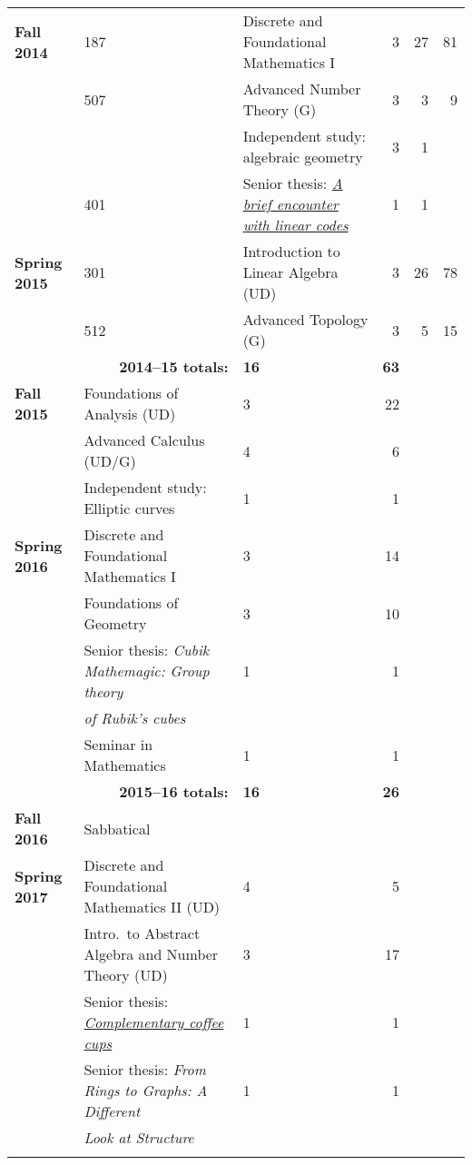 \documentclass[12pt]{article}
\begin{document}
{\begin{center}
\begin{longtable}{@{} l l l rrr @{}}
\textbf{Fall 2014} & 187 & Discrete and Foundational Mathematics I & 3 & 27 & 81 \\
 & 507 & Advanced Number Theory (G) & 3 & 3 & 9 \\
 & & Independent study: algebraic geometry & 3 & 1 \\
 & 401 & Senior thesis: \href{https://scholarworks.boisestate.edu/math_undergraduate_theses/3/}{\emph{A brief encounter with linear codes}} & 1 & 1 \\
\addlinespace[0.1in]

\textbf{Spring 2015} & 301 & Introduction to Linear Algebra (UD) & 3 & 26 & 78 \\
 & 512 & Advanced Topology (G) & 3 & 5 & 15 \\
 \cmidrule{2-4}
 & \multicolumn{1}{r}{\textbf{2014--15 totals:}} & \textbf{16} & \textbf{63} \\
 \cmidrule{2-4}

\textbf{Fall 2015} & Foundations of Analysis (UD) & 3 & 22 \\
 & Advanced Calculus (UD/G) & 4 & 6 \\
 & Independent study: Elliptic curves & 1 & 1 \\
\addlinespace[0.1in]

\textbf{Spring 2016} & Discrete and Foundational Mathematics I & 3 & 14 \\
 & Foundations of Geometry & 3 & 10 \\
 & Senior thesis: \emph{Cubik Mathemagic: Group theory} & 1 & 1 \\
 & \qquad \emph{of Rubik's cubes} & & \\
 & Seminar in Mathematics & 1 & 1 \\

 \cmidrule{2-4}
 & \multicolumn{1}{r}{\textbf{2015--16 totals:}} & \textbf{16} & \textbf{26} \\
 \cmidrule{2-4}

\textbf{Fall 2016} & Sabbatical & & \\
\addlinespace[0.1in]

\textbf{Spring 2017} & Discrete and Foundational Mathematics II (UD) & 4 & 5 \\
 & Intro.\ to Abstract Algebra and Number Theory (UD) & 3 & 17 \\
 & Senior thesis: \href{https://scholarworks.boisestate.edu/math_undergraduate_theses/6/}{\emph{Complementary coffee cups}} & 1 & 1 \\
 & Senior thesis: \emph{From Rings to Graphs: A Different} & 1 & 1 \\
 & \qquad \emph{Look at Structure} & & \\
\addlinespace[0.1in]


\end{longtable}
\end{center}}
\end{document}
